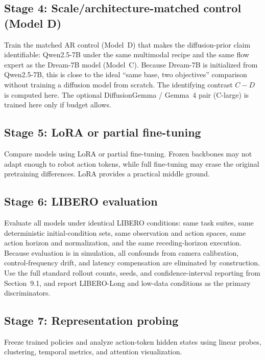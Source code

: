 \documentclass[11pt]{article}
\begin{document}
\subsection{Stage 4: Scale/architecture-matched control (Model D)}

Train the matched AR control (Model~D) that makes the diffusion-prior claim identifiable: Qwen2.5-7B under the same multimodal recipe and the same flow expert as the Dream-7B model (Model~C). Because Dream-7B is initialized from Qwen2.5-7B, this is close to the ideal ``same base, two objectives'' comparison without training a diffusion model from scratch. The identifying contrast $C - D$ is computed here. The optional DiffusionGemma / Gemma~4 pair (\mbox{C-large}) is trained here only if budget allows.

\subsection{Stage 5: LoRA or partial fine-tuning}

Compare models using LoRA or partial fine-tuning. Frozen backbones may not adapt enough to robot action tokens, while full fine-tuning may erase the original pretraining differences. LoRA provides a practical middle ground.

\subsection{Stage 6: LIBERO evaluation}

Evaluate all models under identical LIBERO conditions: same task suites, same deterministic initial-condition sets, same observation and action spaces, same action horizon and normalization, and the same receding-horizon execution. Because evaluation is in simulation, all confounds from camera calibration, control-frequency drift, and latency compensation are eliminated by construction. Use the full standard rollout counts, seeds, and confidence-interval reporting from Section~9.1, and report LIBERO-Long and low-data conditions as the primary discriminators.

\subsection{Stage 7: Representation probing}

Freeze trained policies and analyze action-token hidden states using linear probes, clustering, temporal metrics, and attention visualization.
\end{document}
